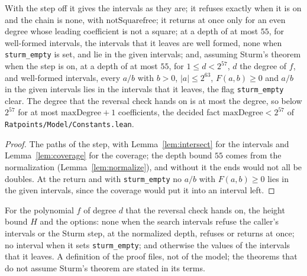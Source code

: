 \begin{lemma}\label{lem:sturmRegion}
  \leanok
  With the step off it gives the intervals as they are; it refuses exactly when it is on and the
  chain is none, with $\mathrm{notSquarefree}$; it returns at once only for an even degree whose
  leading coefficient is not a square; at a depth of at most $55$, for well-formed intervals, the
  intervals that it leaves are well formed, none when \verb|sturm_empty| is set, and lie in the
  given intervals; and, assuming Sturm's theorem when the step is on, at a depth of at most $55$,
  for $1 \le d < 2^{57}$, $d$ the degree of $f$, and well-formed intervals, every $a/b$ with
  $b > 0$, $|a| \le 2^{63}$, $F(a, b) \ge 0$ and $a/b$ in the given intervals lies in the intervals
  that it leaves, the flag \verb|sturm_empty| clear. The degree that the reversal check hands on is
  at most the degree, so below $2^{57}$ for at most $\mathrm{maxDegree} + 1$ coefficients, the
  decided fact $\mathrm{maxDegree} < 2^{57}$ of \verb|Ratpoints/Model/Constants.lean|.
\end{lemma}

\begin{proof}
  \leanok
  The paths of the step, with Lemma~\ref{lem:intersect} for the intervals and
  Lemma~\ref{lem:coverage} for the coverage; the depth bound $55$ comes from the normalization
  (Lemma~\ref{lem:normalize}), and without it the ends would not all be doubles. At the return and
  with \verb|sturm_empty| no $a/b$ with $F(a, b) \ge 0$ lies in the given intervals, since the
  coverage would put it into an interval left.
\end{proof}

\begin{definition}\label{def:searchRegion}
  \leanok
  For the polynomial $f$ of degree $d$ that the reversal check hands on, the height bound $H$ and
  the options: none when the search intervals refuse the caller's intervals or the Sturm step, at
  the normalized depth, refuses or returns at once; no interval when it sets \verb|sturm_empty|; and
  otherwise the values of the intervals that it leaves. A definition of the proof files, not of the
  model; the theorems that do not assume Sturm's theorem are stated in its terms.
\end{definition}

